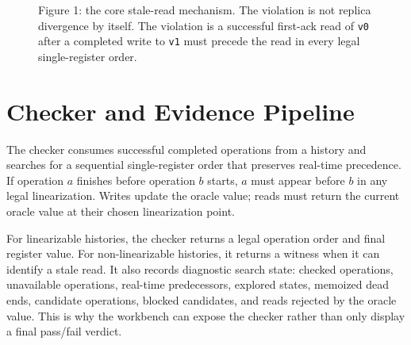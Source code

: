 \documentclass[10pt]{article}
\newcommand{\firstack}{first-ack}
\newcommand{\quorum}{quorum}
\begin{document}
\begin{figure}[t]
\centering
{}
\caption{Figure 1: the core stale-read mechanism. The violation is not replica divergence by
itself. The violation is a successful \firstack{} read of \texttt{v0} after a completed write to
\texttt{v1} must precede the read in every legal single-register order.}
\end{figure}

\section{Checker and Evidence Pipeline}

The checker consumes successful completed operations from a history and searches for a sequential
single-register order that preserves real-time precedence. If operation $a$ finishes before
operation $b$ starts, $a$ must appear before $b$ in any legal linearization. Writes update the
oracle value; reads must return the current oracle value at their chosen linearization point.

For linearizable histories, the checker returns a legal operation order and final register value.
For non-linearizable histories, it returns a witness when it can identify a stale read. It also
records diagnostic search state: checked operations, unavailable operations, real-time
predecessors, explored states, memoized dead ends, candidate operations, blocked candidates, and
reads rejected by the oracle value. This is why the workbench can expose the checker rather than
only display a final pass/fail verdict.
\end{document}
